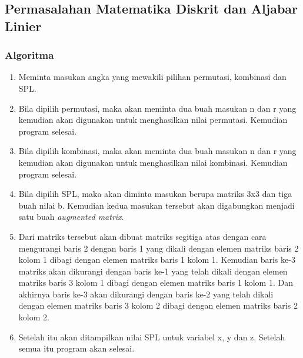 \documentclass[../main.tex]{subfiles}
\begin{document}
    \subsection{Permasalahan Matematika Diskrit dan Aljabar Linier}
    \subsubsection{Algoritma}
    {\renewcommand{\labelenumi}{\alph{enumi}.}
        \begin{enumerate}[leftmargin=1.56cm]
            \item{Meminta masukan angka yang mewakili pilihan permutasi, kombinasi dan SPL.}
            \item{Bila dipilih permutasi, maka akan meminta dua buah masukan n dan r yang kemudian akan digunakan untuk menghasilkan nilai permutasi. Kemudian program selesai.}
            \item{Bila dipilih kombinasi, maka akan meminta dua buah masukan n dan r yang kemudian akan digunakan untuk menghasilkan nilai kombinasi. Kemudian program selesai.}
            \item{Bila dipilih SPL, maka akan diminta masukan berupa matriks 3x3 dan tiga buah nilai b. Kemudian kedua masukan tersebut akan digabungkan menjadi satu buah \textit{augmented matrix}.}
            \item{Dari matriks tersebut akan dibuat matriks segitiga atas dengan cara mengurangi baris 2 dengan baris 1 yang dikali dengan elemen matriks baris 2 kolom 1 dibagi dengan elemen matriks baris 1 kolom 1. Kemudian baris ke-3 matriks akan dikurangi dengan baris ke-1 yang telah dikali dengan elemen matriks baris 3 kolom 1 dibagi dengan elemen matriks baris 1 kolom 1. Dan akhirnya baris ke-3 akan dikurangi dengan baris ke-2 yang telah dikali dengan elemen matriks baris 3 kolom 2 dibagi dengan elemen matriks baris 2 kolom 2.}
            \item{Setelah itu akan ditampilkan nilai SPL untuk variabel x, y dan z. Setelah semua itu program akan selesai.}
        \end{enumerate}
    }
    \subsubsection{\Flowchart}
    \vspace{-0.5ex}
    \subsubsection{\SourceCode}
    \vspace{-0.5ex}
\begin{indentlevel0}
    \vspace{-0.15ex}
    
    
\end{indentlevel0}
\end{document}
